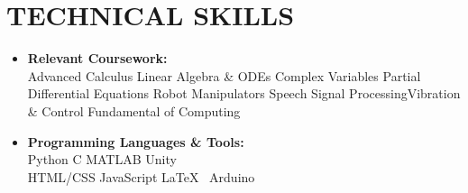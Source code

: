 \documentclass[6pt,a4paper,roman]{moderncv}        %
\begin{document}
{{{\section{\large{TECHNICAL SKILLS}}
\vspace*{-1.5mm}
\begin{minipage}{1.15\maincolumnwidth}%
	\small{
    	\begin{itemize}
          \item \textbf{Relevant Coursework:}\\   \textbullet{}Advanced Calculus\hspace{0.6cm}  \textbullet{}Linear Algebra \& ODEs\hspace{0.6cm}  \textbullet{}Complex Variables\hspace{0.6cm} \textbullet{}Partial Differential Equations \hspace{0.8cm}\textbullet{}Robot Manipulators\hspace{0.4cm} \textbullet{}Speech Signal Processing\hspace{0.55cm}\textbullet{}Vibration \& Control \hspace{0.2cm} \textbullet{}Fundamental of Computing 
          \item \textbf{Programming Languages \& Tools:}\\ \textbullet{}Python\hspace{2.4cm} 
          \textbullet{}C\hspace{4.0cm} 
          \textbullet{}MATLAB\hspace{1.95cm}
          \textbullet{}Unity\\
          \textbullet{}HTML/CSS\hspace{1.65cm} \textbullet{}JavaScript\hspace{2.7cm} \textbullet{}\LaTeX\ \hspace{2.5cm}
          \textbullet{}Arduino
		\end{itemize}}%
\end{minipage}%



}}}
\end{document}
